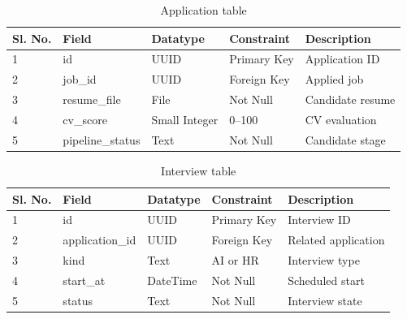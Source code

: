 \begin{table}
 \centering
  \begin{tabular}{|l|l|l|l|l|}
    \hline 
   Sl. No.&  Field&  Datatype&  Constraint& Description \\
     \hline  
    1 & id & UUID &Primary Key  & Application ID\\ 
      \hline 
     2 & job\_id  & UUID & Foreign Key & Applied job\\
     \hline 
     3  & resume\_file & File & Not Null & Candidate resume \\ 
     \hline
     4 & cv\_score & Small Integer & 0--100 & CV evaluation \\
     \hline
     5 & pipeline\_status & Text & Not Null & Candidate stage \\
				\hline
    \end{tabular}
    \caption{Application table}
\label{table:applications}
\end{table}
\begin{table}
 \centering
  \begin{tabular}{|l|l|l|l|l|}
    \hline 
   Sl. No.&  Field&  Datatype&  Constraint& Description \\
     \hline  
    1 & id & UUID &Primary Key  & Interview ID\\ 
      \hline 
     2 & application\_id  & UUID & Foreign Key & Related application\\
     \hline 
     3  & kind & Text & AI or HR & Interview type \\ 
     \hline
     4 & start\_at & DateTime & Not Null & Scheduled start \\
     \hline
     5 & status & Text & Not Null & Interview state \\
				\hline
    \end{tabular}
    \caption{Interview table}
\label{table:interviews}
\end{table}

%
